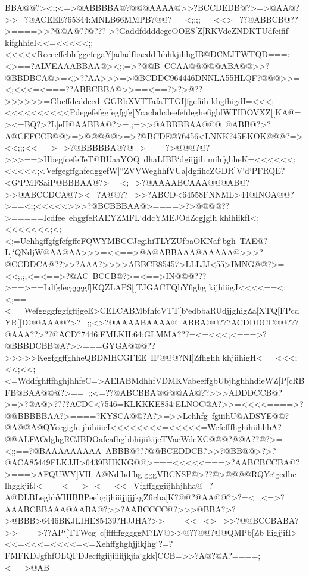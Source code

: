 {{{ BBA@@?><;;<=>@ABBBBA@?@@@AAAA@>>?BCCDEDB@?>=>@AA@?>>=?@ACEEE?65344:MNLB66MMPB?@@?==<;;;;==<<>=??@ABBCB@??>====>>?@@A@??@???%
 >?GaddfddddegeOOES[Z[RKVdeZNDKTUdfeifif}
 \hbox{kifghhieI<<=<<<<<;;<<<<<RceecffcbhfggefegaY]adadfbaeddfhhhkjihhgIB@DCMJTWTQD===::<>==?ALVEAAABBAA@><;;=>?@@B%
 CCAA@@@@@ABA@@>>?@BBDBCA@>=<>??AA>>>=>@BCDDC964446DNNLA55HLQF?@@@>>=<;<<<=<===??ABBCBBA@>>==<==?>?>@??>>>>>>=Gbeffdcddeed%
 GGRbXVTTafaTTGI]fgefiih}
 \hbox{khgfhigdI=<<<;<<<<<<<<<<Pdegefefggfegfgfg[YcacbdcdeefefdeghefighfWTIDOVXZ[[KA@=><=BQ?>?L]eH@AABBA@?>=;;=>>@ABBBBAA@@@%
 @ABB@?>?A@CEFCCB@@>=>@@@@@>=>?@BCDE@76456<LNNK?45EKOK@@@?=><<;;;<<==>=>?@BBBBBA@?@=>===?>@@@?@?>>>==>HbegfcefeffeT@BUaaYOQ%
 dhaLIBB`dgiijjih}
 \hbox{mihfghheK=<<<<<<;<<<<<;<VefgegffghfedggefW]``ZVVWeghhfVUa]dgfihcZGDR]V`d`PFRQE?<G`PMFSaiP@BBBAA@?>=%
 <;=>?@AAAABCAAA@@@AB@?>>@ABCCDCA@?><=?A@@??=>>?ABCD<64558FNNML>44@INOA@@?>==<;;<<<<<>>>?@BCBBBAA@>====>?>@@@@??>=====Icdfee%
 ehggfeRAEYZMFL`ddcYMEJOdZcgjgih}
 \hbox{khihiikfI<;<<<<<<<;<;<;=UehhgffgfgfefgffeFQWYMBCCJcgihiTLYZUfbaOKNaf`bgh%
 TAE@?L]`QNdjW@AA@AA>>>=<<==>@A@ABBAAA@AAAAA@>>>?@CCDDCA@??>>?AAA?>>>>ABBCB85457>LLLJJ<55>IMNG@@?>=<<;;;;<=<==>?@AC%
 BCCB@?>=<==>IN@@@???>==>==Ldfgfecggggf]KQZLAPS[[TJGACTQbYfighg}
 \hbox{kijhiiigJ<<<<==<;<;==<==WefggggfggfgfijgeE>CELCABMbfhfcVTT[b`edbbaRUdjjghigZa[XTQ[FPcdYR[[D@@AAA@?>?=;;<>?@AAAABAAAA@%
 ABBA@@???ACDDDCC@@???@AAA??>??@ACD?7446:FMLKII:64:GLMMA???=<=<<<;<===>?@BBBDCBB@A?>>===GYGA@@@??>>>>>KegfggffghheQBDMHCGFEE%
 IF@@@?NI]Zfhghh}
 \hbox{khjiihigH<==<<<;<<;<<;<=WddfghfffhghjhhfeC=>AEIABMdhhfVDMKVabeeffgbUbjhghhhdieWZ[P[cRBFB@BAA@@@?>==%
 ;;<=??@ABCBBA@@@@AA@??>>>ADDDCCB@?>=>?@A@>????ACDC<7546=KLKKKE854:ELNOC@A?>>=<<<<====>?@@BBBBBAA?>====?KYSCA@@?A?>=>>Lehhfg%
 fgiiihU@ADSYE@@?@A@@A@QYeegigfe}
 \hbox{jhihiiieI<<<<<<<<=<<<<<=WefefffhghihiihhbA?@@ALFAOdghgRCJBDOafcafhgbbhijiikijcTVaeWdeXC@@@?@@A??@?>=<;;==?@BAAAAAAAAA%
 ABBB@???@@BCEDDCB?>>?@BB@@>?>?@ACA85449FLKJJI>6439BHKKG@@>===<<<<<===>?AABCBCCBA@?>===>AFQUWY]VH%
 A@NdfhdfhgigggVBCNSP@>??@>@@@@RQYc`gcdbe}
 \hbox{lhggkjifJ<===<==>=<==<<=Vfgffgggiijhhjhha@=?A@DLBLeghhVHIBBPeebgijhiiijjjjjkgZficba[K?@@?@AA@@?>?=<%
 ;<=>?AAABCBBAAA@AABA@?>>?AABCCCC@?>>>@BBA?>?>@BBB>6446BKJLIHE85439?HJJHA?>>===<<=<>=>>?@@BCCBABA?>>===>??AP`[TTWcg%
 c[ffffffgggggM?LV@>>@??@@?@@QMPb[Zb}
 \hbox{liigjjifI><<=<<<=<<<<=<=Xehffghghjjikjhg`?=?FMFKDJgfhfOLQFDJecffgiijiiiiijkjia`gkk]CCB=>>?A@?@A?====;<==>@AB%
}}}
